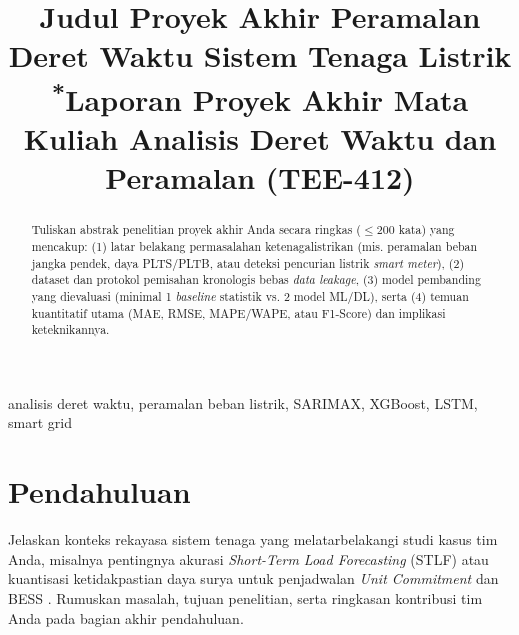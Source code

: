 \documentclass[conference]{IEEEtran}
\begin{document}
\title{Judul Proyek Akhir Peramalan Deret Waktu Sistem Tenaga Listrik\\
{\footnotesize \textsuperscript{*}Laporan Proyek Akhir Mata Kuliah Analisis Deret Waktu dan Peramalan (TEE-412)}}

\author{
\and
{}
\and
{}
}

\maketitle

\begin{abstract}
Tuliskan abstrak penelitian proyek akhir Anda secara ringkas ($\le 200$ kata) yang mencakup: (1) latar belakang permasalahan ketenagalistrikan (mis. peramalan beban jangka pendek, daya PLTS/PLTB, atau deteksi pencurian listrik \textit{smart meter}), (2) dataset dan protokol pemisahan kronologis bebas \textit{data leakage}, (3) model pembanding yang dievaluasi (minimal 1 \textit{baseline} statistik vs. 2 model ML/DL), serta (4) temuan kuantitatif utama (MAE, RMSE, MAPE/WAPE, atau F1-Score) dan implikasi keteknikannya.
\end{abstract}

\begin{IEEEkeywords}
analisis deret waktu, peramalan beban listrik, SARIMAX, XGBoost, LSTM, smart grid
\end{IEEEkeywords}

\section{Pendahuluan}
Jelaskan konteks rekayasa sistem tenaga yang melatarbelakangi studi kasus tim Anda, misalnya pentingnya akurasi \textit{Short-Term Load Forecasting} (STLF) atau kuantisasi ketidakpastian daya surya untuk penjadwalan \textit{Unit Commitment} dan BESS \cite{box2015, hyndman2021}. Rumuskan masalah, tujuan penelitian, serta ringkasan kontribusi tim Anda pada bagian akhir pendahuluan.
\end{document}
